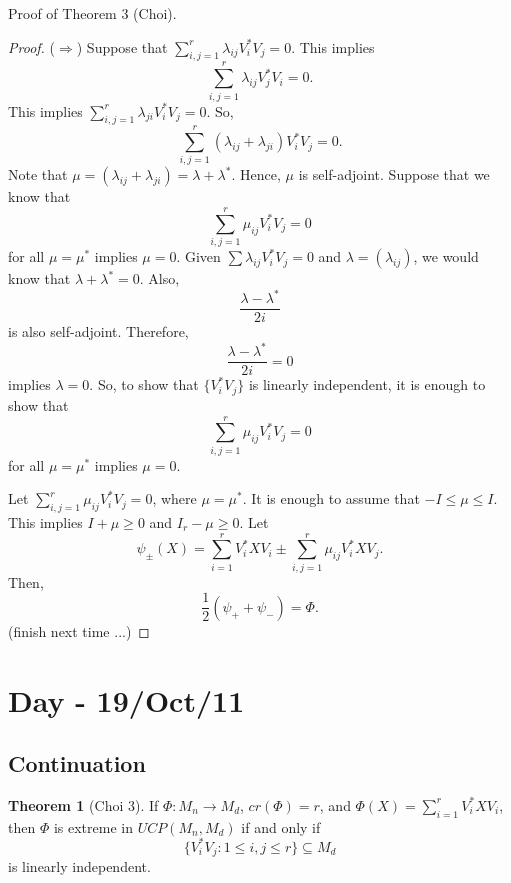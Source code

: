 \documentclass[12pt]{article}
\theoremstyle{definition}
\newtheorem*{theorem}{Theorem}
\begin{document}
Proof of Theorem 3 (Choi).\begin{proof}
($\Rightarrow$) Suppose that $\sum_{i,j=1}^r \lambda_{ij}V_i^*V_j = 0$. This implies
\[
\sum_{i,j=1}^r \lambda_{ij}V_j^*V_i = 0.
\]
This implies $\sum_{i,j=1}^r \lambda_{ji}V_i^*V_j = 0$. So,
\[
\sum_{i,j=1}^r (\lambda_{ij}+\lambda_{ji})V_i^*V_j = 0.
\]
Note that $\mu=(\lambda_{ij}+\lambda_{ji}) = \lambda + \lambda^*$. Hence, $\mu$ is self-adjoint. Suppose that we know that
\[
\sum_{i,j=1}^r \mu_{ij}V_i^*V_j = 0
\]
for all $\mu = \mu^*$ implies $\mu=0$. Given $\sum \lambda_{ij}V_i^*V_j = 0$ and $\lambda=(\lambda_{ij})$, we would know that $\lambda + \lambda^*=0$. Also,
\[
\frac{\lambda-\lambda^*}{2i}
\]
is also self-adjoint. Therefore,
\[
\frac{\lambda-\lambda^*}{2i}=0
\]
implies $\lambda=0$.
So, to show that $\{V_i^*V_j\}$ is linearly independent, it is enough to show that
\[
\sum_{i,j=1}^r \mu_{ij}V_i^*V_j = 0
\]
for all $\mu=\mu^*$ implies $\mu=0$.

Let $\sum_{i,j=1}^r \mu_{ij}V_i^*V_j=0$, where $\mu=\mu^*$. It is enough to assume that $-I \leq \mu \leq I$. This implies $I+\mu \geq 0$ and $I_r-\mu \geq 0$.
Let
\[
\psi_\pm(X) = \sum_{i=1}^r V_i^*XV_i \pm \sum_{i,j=1}^r \mu_{ij}V_i^*XV_j.
\]
Then,
\[
\frac{1}{2}(\psi_+ + \psi_-) = \Phi.
\]
(finish next time ...)
\end{proof}

\section{Day - 19/Oct/11}

\subsection{Continuation}

\begin{theorem}[Choi 3]
If $\Phi : M_n \to M_d$, $cr(\Phi)=r$, and $\Phi(X)=\sum_{i=1}^r V_i^*XV_i$, then $\Phi$ is extreme in $UCP(M_n,M_d)$ if and only if
\[
\{V_i^*V_j : 1 \leq i,j \leq r\} \subseteq M_d
\]
is linearly independent.
\end{theorem}
\end{document}
